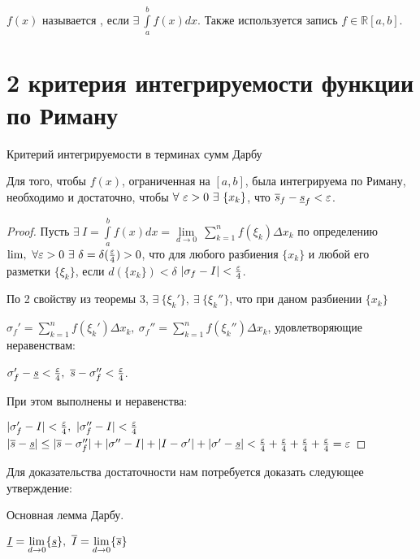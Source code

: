 \begin{opred}
$f(x)$ называется , если $\exists\ \int\limits^b_af(x)dx$. Также используется запись $f\in \mathbb{R}[a,b]$.
\end{opred}
\section{2 критерия интегрируемости функции по Риману}
\begin{theor}Критерий интегрируемости в терминах сумм Дарбу

Для того, чтобы $f(x)$, ограниченная на $[a,b]$, была интегрируема по Риману, необходимо и достаточно, чтобы $\forall\ \varepsilon>0\ \exists\ \{x_k\}$, что $\overline{s}_f-\underline{s}_f<\varepsilon$.
\end{theor}
\begin{proof}

Пусть $\exists\ I=\int\limits^b_af(x)dx=\underset{d\to0}{\lim}\ \sum\limits^n_{k=1}f(\xi_k)\Delta x_k$ \then по определению $\lim,\ \forall \eps>0\ \exists\ \delta=\delta(\frac\eps4)>0$, что для любого разбиения $\{x_k\}$ и любой его разметки $\{\xi_k\}$, если $d(\{x_k\})<\delta$ \then $|\sigma_f-I|<\frac{\varepsilon}4$.

По 2 свойству из теоремы 3, $\exists\ \{\xi_k'\},\ \exists\ \{\xi_k''\}$, что при даном разбиении $\{x_k\}$

$\sigma_f'=\sum\limits^n_{k=1}f(\xi_k')\Delta x_k,\ \sigma_f''=\sum\limits^n_{k=1}f(\xi_k'')\Delta x_k$, удовлетворяющие неравенствам:

$\sigma_f'-\ns<\frac\eps4,\ \vs-\sigma_f''<\frac\eps4$.

При этом выполнены и неравенства:

$|\sigma_f'-I|<\frac\eps4,\ |\sigma_f''-I|<\frac\eps4$ \then $|\overline{s}-\underline{s}|\leq|\overline{s}-\sigma_f''|+|\sigma''-I|+|I-\sigma'|+|\sigma'-\underline{s}|<\frac{\varepsilon}4+\frac{\varepsilon}4+\frac{\varepsilon}4+\frac{\varepsilon}4=\varepsilon$
\end{proof}
Для доказательства достаточности нам потребуется доказать следующее утверждение:
\begin{lemma}Основная лемма Дарбу.

$\nis=\underset{d\to0}{\lim}\{\ns\},\ \vis=\underset{d\to0}{\lim}\{\vs\}$
\end{lemma}

